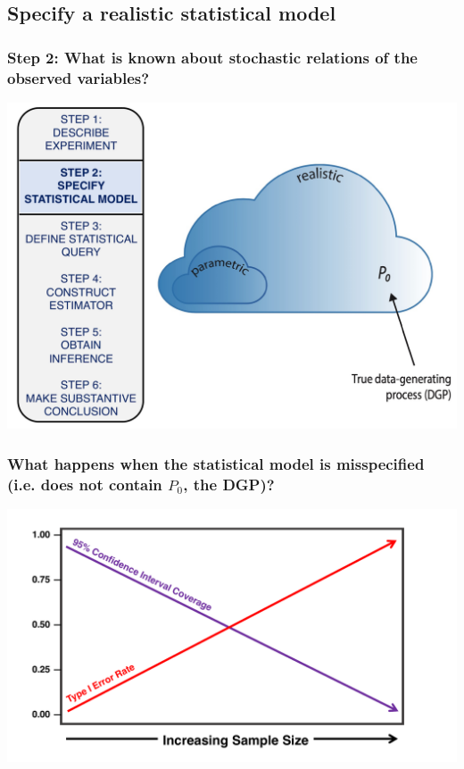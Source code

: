 \documentclass[t]{beamer}
\begin{document}
\subsection{Specify a realistic statistical model}

\begin{frame}
  \frametitle{Step 2: What is known about stochastic relations of the observed variables?}
  \vspace{-20pt}
  \begin{center}
  \includegraphics[width = 1.05\textwidth]{figures/roadmap2.pdf}
  \end{center}
\end{frame}

\begin{frame}
\frametitle{What happens when the statistical model is misspecified (i.e. does not contain $P_0$, the DGP)?}
\vspace{15pt}
\centering
\includegraphics[width=1.05\textwidth]{figures/misspecified.pdf}
\end{frame}
\end{document}
